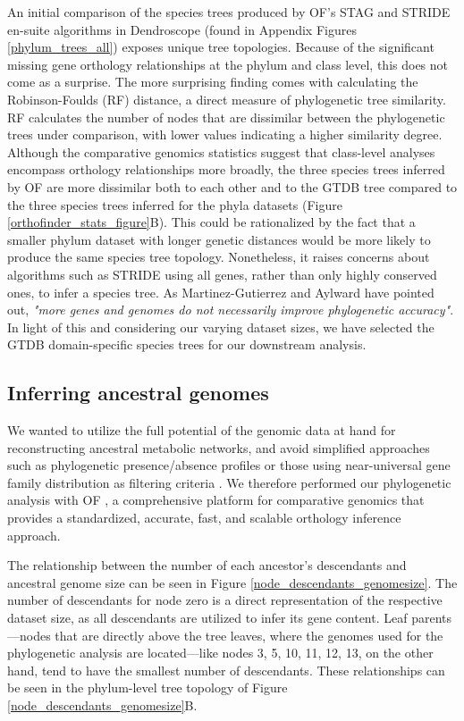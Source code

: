 An initial comparison of the species trees produced by OF's STAG \cite{emms2018} and STRIDE \cite{emms2017} en-suite algorithms in Dendroscope \cite{huson2012} (found in Appendix Figures \ref{phylum_trees_all}) exposes unique tree topologies. Because of the significant missing gene orthology relationships at the phylum and class level, this does not come as a surprise. The more surprising finding comes with calculating the Robinson-Foulds (RF) distance, a direct measure of phylogenetic tree similarity. RF calculates the number of nodes that are dissimilar between the phylogenetic trees under comparison, with lower values indicating a higher similarity degree. Although the comparative genomics statistics suggest that class-level analyses encompass orthology relationships more broadly, the three species trees inferred by OF are more dissimilar both to each other and to the GTDB tree compared to the three species trees inferred for the phyla datasets (Figure \ref{orthofinder_stats_figure}B). This could be rationalized by the fact that a smaller phylum dataset with longer genetic distances would be more likely to produce the same species tree topology. Nonetheless, it raises concerns about algorithms such as STRIDE using all genes, rather than only highly conserved ones, to infer a species tree. As Martinez-Gutierrez and Aylward \cite{martinez-gutierrez2021} have pointed out, \textit{"more genes and genomes do not necessarily improve phylogenetic accuracy"}. In light of this and considering our varying dataset sizes, we have selected the GTDB domain-specific species trees for our downstream analysis.



\subsection*{Inferring ancestral genomes}

We wanted to utilize the full potential of the genomic data at hand for reconstructing ancestral metabolic networks, and avoid simplified approaches such as phylogenetic presence/absence profiles \cite{kreimer2008} or those using near-universal gene family distribution as filtering criteria \cite{xavier2021}. We therefore performed our phylogenetic analysis with OF \cite{emms2019, emms2015}, a comprehensive platform for comparative genomics that provides a standardized, accurate, fast, and scalable orthology inference approach. 

The relationship between the number of each ancestor's descendants and ancestral genome size can be seen in Figure \ref{node_descendants_genomesize}. The number of descendants for node zero is a direct representation of the respective dataset size, as all descendants are utilized to infer its gene content. Leaf parents---nodes that are directly above the tree leaves, where the genomes used for the phylogenetic analysis are located---like nodes 3, 5, 10, 11, 12, 13, on the other hand, tend to have the smallest number of descendants. These relationships can be seen in the phylum-level tree topology of Figure \ref{node_descendants_genomesize}B.

